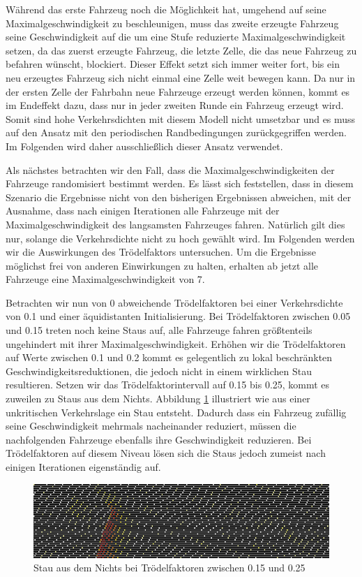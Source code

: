 \documentclass[10pt, a4paper]{article}
\begin{document}
Während das erste Fahrzeug noch die Möglichkeit hat, umgehend auf seine Maximalgeschwindigkeit zu beschleunigen, muss das zweite erzeugte Fahrzeug seine Geschwindigkeit auf die um eine Stufe reduzierte Maximalgeschwindigkeit setzen, da das zuerst erzeugte Fahrzeug, die letzte Zelle, die das neue Fahrzeug zu befahren wünscht, blockiert. Dieser Effekt setzt sich immer weiter fort, bis ein neu erzeugtes Fahrzeug sich nicht einmal eine Zelle weit bewegen kann. Da nur in der ersten Zelle der Fahrbahn neue Fahrzeuge erzeugt werden können, kommt es im Endeffekt dazu, dass nur in jeder zweiten Runde ein Fahrzeug erzeugt wird. Somit sind hohe Verkehrsdichten mit diesem Modell nicht umsetzbar und es muss auf den Ansatz mit den periodischen Randbedingungen zurückgegriffen werden. Im Folgenden wird daher ausschließlich dieser Ansatz verwendet.

Als nächstes betrachten wir den Fall, dass die Maximalgeschwindigkeiten der Fahrzeuge randomisiert bestimmt werden. Es lässt sich feststellen, dass in diesem Szenario die Ergebnisse nicht von den bisherigen Ergebnissen abweichen, mit der Ausnahme, dass nach einigen Iterationen alle Fahrzeuge mit der Maximalgeschwindigkeit des langsamsten Fahrzeuges fahren. Natürlich gilt dies nur, solange die Verkehrsdichte nicht zu hoch gewählt wird. Im Folgenden werden wir die Auswirkungen des Trödelfaktors untersuchen. Um die Ergebnisse möglichst frei von anderen Einwirkungen zu halten, erhalten ab jetzt alle Fahrzeuge eine Maximalgeschwindigkeit von 7.

Betrachten wir nun von 0 abweichende Trödelfaktoren bei einer Verkehrsdichte von 0.1 und einer äquidistanten Initialisierung. Bei Trödelfaktoren zwischen 0.05 und 0.15 treten noch keine Staus auf, alle Fahrzeuge fahren größtenteils ungehindert mit ihrer Maximalgeschwindigkeit. Erhöhen wir die Trödelfaktoren auf Werte zwischen 0.1 und 0.2 kommt es gelegentlich zu lokal beschränkten Geschwindigkeitsreduktionen, die jedoch nicht in einem wirklichen Stau resultieren. Setzen wir das Trödelfaktorintervall auf 0.15 bis 0.25, kommt es zuweilen zu Staus aus dem Nichts. Abbildung \ref{fig:ergStauAusDemNichtsP0_2} illustriert wie aus einer unkritischen Verkehrslage ein Stau entsteht. Dadurch dass ein Fahrzeug zufällig seine Geschwindigkeit mehrmals nacheinander reduziert, müssen die nachfolgenden Fahrzeuge ebenfalls ihre Geschwindigkeit reduzieren. Bei Trödelfaktoren auf diesem Niveau lösen sich die Staus jedoch zumeist nach einigen Iterationen eigenständig auf.

\begin{figure}[h!]
	\centering
	\includegraphics[width=\textwidth]{img/erg_einspurig_stau_aus_dem_nichts_dichte_0_1_p_0_15_bis_0_25}
	\caption{Stau aus dem Nichts bei Trödelfaktoren zwischen 0.15 und 0.25}
	\label{fig:ergStauAusDemNichtsP0_2}
\end{figure}
\end{document}
